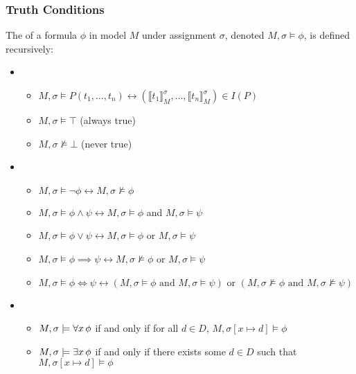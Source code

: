 \subsubsection{Truth Conditions}\label{subsubsec:truth_conditions}
The  of a formula \(\phi\) in model \(M\) under assignment \(\sigma\), denoted \(M, \sigma \models \phi\), is defined recursively:

\begin{itemize}
  \item {}
  \begin{itemize}
    \item \(M, \sigma \models P(t_1, \ldots, t_n) \leftrightarrow (\llbracket t_1 \rrbracket_M^\sigma, \ldots, \llbracket t_n \rrbracket_M^\sigma) \in I(P)\)
    \item \(M, \sigma \models \top\) (always true)
    \item \(M, \sigma \not\models \bot\) (never true)
  \end{itemize}
  
  \item {}
  \begin{itemize}
    \item \(M, \sigma \models \neg \phi \leftrightarrow M, \sigma \not\models \phi\)
    \item \(M, \sigma \models \phi \land \psi \leftrightarrow M, \sigma \models \phi\) and \(M, \sigma \models \psi\)
    \item \(M, \sigma \models \phi \lor \psi \leftrightarrow M, \sigma \models \phi\) or \(M, \sigma \models \psi\)
    \item \(M, \sigma \models \phi \implies \psi \leftrightarrow M, \sigma \not\models \phi\) or \(M, \sigma \models \psi\)
    \item \(M, \sigma \models \phi \iff \psi \leftrightarrow \left(M, \sigma \models \phi \text{ and } M, \sigma \models \psi\right) \text{ or } \left(M, \sigma \not\models \phi \text{ and } M, \sigma \not\models \psi\right)\)
  \end{itemize}
  
  \item {}
  \begin{itemize}
    \item \(M, \sigma \models \forall x  \,  \phi\) if and only if for all \(d \in D\), \(M, \sigma[x \mapsto d] \models \phi\)
    \item \(M, \sigma \models \exists x  \,  \phi\) if and only if there exists some \(d \in D\) such that \(M, \sigma[x \mapsto d] \models \phi\)
  \end{itemize}
\end{itemize}


